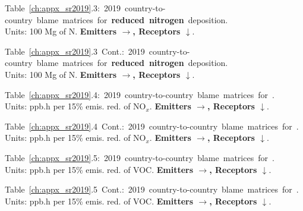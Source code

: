 \footnotesize{\mbox{Table \ref{ch:appx_sr2019}.3: 2019 country-to-country blame matrices for \textbf{reduced nitrogen} deposition.}\\ Units: 100 Mg of N. \textbf{Emitters $\rightarrow$, Receptors $\downarrow$}. }\\[\baselineskip]\enlargethispage{\myenlarge} \hspace{-0.5cm} 
\centerline{}\clearpage
\footnotesize{\mbox{Table \ref{ch:appx_sr2019}.3 Cont.: 2019 country-to-country blame matrices for \textbf{reduced nitrogen} deposition.}\\ Units: 100 Mg of N. \textbf{Emitters $\rightarrow$, Receptors $\downarrow$}. }\\[\baselineskip]\enlargethispage{\myenlarge} \hspace{-0.5cm} 
\centerline{}\clearpage

\footnotesize{\mbox{Table \ref{ch:appx_sr2019}.4: 2019 country-to-country blame matrices for \textbf{\aotucf}.}\\ Units: ppb.h per 15\% emis. red. of NO$_x$. \textbf{Emitters $\rightarrow$, Receptors $\downarrow$}. }\\[\baselineskip]\enlargethispage{\myenlarge} \hspace{-0.5cm} 
\centerline{}\clearpage
\footnotesize{\mbox{Table \ref{ch:appx_sr2019}.4 Cont.: 2019 country-to-country blame matrices for \textbf{\aotucf}.}\\ Units: ppb.h per 15\% emis. red. of NO$_x$. \textbf{Emitters $\rightarrow$, Receptors $\downarrow$}. }\\[\baselineskip]\enlargethispage{\myenlarge} \hspace{-0.5cm} 
\centerline{}\clearpage

\footnotesize{\mbox{Table \ref{ch:appx_sr2019}.5: 2019 country-to-country blame matrices for \textbf{\aotucf}.}\\ Units: ppb.h per 15\% emis. red. of VOC. \textbf{Emitters $\rightarrow$, Receptors $\downarrow$}. }\\[\baselineskip]\enlargethispage{\myenlarge} \hspace{-0.5cm} 
\centerline{}\clearpage
\footnotesize{\mbox{Table \ref{ch:appx_sr2019}.5 Cont.: 2019 country-to-country blame matrices for \textbf{\aotucf}.}\\ Units: ppb.h per 15\% emis. red. of VOC. \textbf{Emitters $\rightarrow$, Receptors $\downarrow$}. }\\[\baselineskip]\enlargethispage{\myenlarge} \hspace{-0.5cm} 
\centerline{}\clearpage

